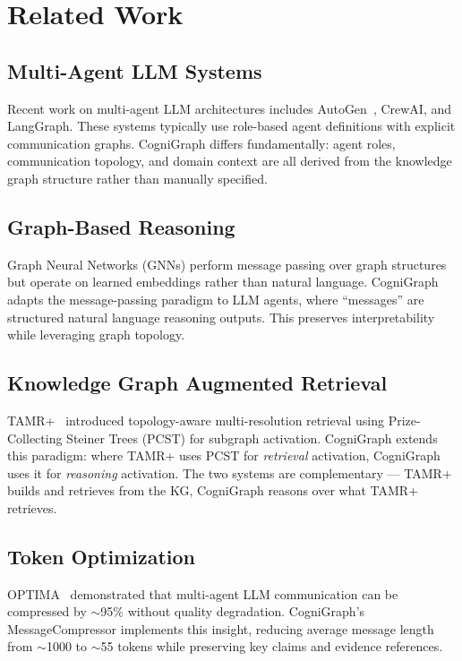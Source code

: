 \documentclass[11pt,a4paper]{article}
\begin{document}
\section{Related Work}
\label{sec:related}

\subsection{Multi-Agent LLM Systems}
Recent work on multi-agent LLM architectures includes AutoGen~\citep{autogen2023}, CrewAI, and LangGraph. These systems typically use role-based agent definitions with explicit communication graphs. CogniGraph differs fundamentally: agent roles, communication topology, and domain context are all derived from the knowledge graph structure rather than manually specified.

\subsection{Graph-Based Reasoning}
Graph Neural Networks (GNNs) perform message passing over graph structures but operate on learned embeddings rather than natural language. CogniGraph adapts the message-passing paradigm to LLM agents, where ``messages'' are structured natural language reasoning outputs. This preserves interpretability while leveraging graph topology.

\subsection{Knowledge Graph Augmented Retrieval}
TAMR+~\citep{tamrplus2026} introduced topology-aware multi-resolution retrieval using Prize-Collecting Steiner Trees (PCST) for subgraph activation. CogniGraph extends this paradigm: where TAMR+ uses PCST for \emph{retrieval} activation, CogniGraph uses it for \emph{reasoning} activation. The two systems are complementary --- TAMR+ builds and retrieves from the KG, CogniGraph reasons over what TAMR+ retrieves.

\subsection{Token Optimization}
OPTIMA~\citep{optima2024} demonstrated that multi-agent LLM communication can be compressed by $\sim$95\% without quality degradation. CogniGraph's MessageCompressor implements this insight, reducing average message length from $\sim$1000 to $\sim$55 tokens while preserving key claims and evidence references.
\end{document}
